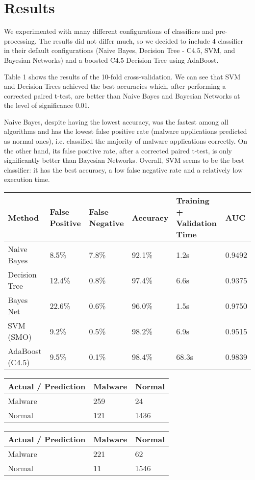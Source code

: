 \section{Results}
We experimented with many different configurations of classifiers and pre-processing. The results did not differ much, so we decided to include 4 classifier in their default configurations (Naive Bayes, Decision Tree - C4.5, SVM, and Bayesian Networks) and a boosted C4.5 Decision Tree using AdaBoost.

Table 1 shows the results of the 10-fold cross-validation. We can see that SVM and Decision Trees achieved the best accuracies which, after performing a corrected paired t-test, are better than Naive Bayes and Bayesian Networks at the level of significance 0.01.

Naive Bayes, despite having the lowest accuracy, was the fastest among all algorithms and has the lowest false positive rate (malware applications predicted as normal ones), i.e. classified the majority of malware applications correctly. On the other hand, its false positive rate, after a corrected paired t-test, is only significantly better than Bayesian Networks. Overall, SVM seems to be the best classifier: it has the best accuracy, a low false negative rate and a relatively low execution time.
\begin{tabular}{|l|l l l l l|}
\hline
Method & False Positive & False Negative & Accuracy & Training + Validation Time & AUC \\
\hline
Naive Bayes & 8.5\% & 7.8\% & 92.1\% & 1.2s & 0.9492 \\
Decision Tree & 12.4\% & 0.8\% & 97.4\% & 6.6s & 0.9375 \\
Bayes Net & 22.6\% & 0.6\% & 96.0\% & 1.5s & 0.9750 \\
SVM (SMO) & 9.2\% & 0.5\% & 98.2\% & 6.9s & 0.9515 \\
AdaBoost (C4.5) & 9.5\% & 0.1\% & 98.4\% & 68.3s & 0.9839 \\
\hline
\end{tabular}
\begin{tabular}{|l|l l|}
\hline
Actual / Prediction & Malware & Normal \\
\hline
Malware & 259 & 24 \\
Normal & 121 & 1436 \\
\hline
\end{tabular}
\begin{tabular}{|l|l l|}
\hline
Actual / Prediction & Malware & Normal \\
\hline
Malware & 221 & 62 \\
Normal & 11 & 1546 \\
\hline
\end{tabular}
